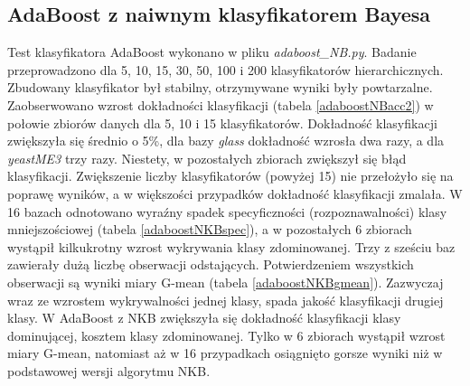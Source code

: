 \subsection{AdaBoost z naiwnym klasyfikatorem Bayesa}
Test klasyfikatora AdaBoost wykonano w pliku \textit{adaboost\_NB.py}. Badanie przeprowadzono dla 5, 10, 15, 30, 50, 100 i 200 klasyfikatorów hierarchicznych. Zbudowany klasyfikator był stabilny, otrzymywane wyniki były powtarzalne. Zaobserwowano wzrost dokładności klasyfikacji (tabela \ref{adaboostNBacc2}) w połowie zbiorów danych dla 5, 10 i 15 klasyfikatorów. Dokładność klasyfikacji zwiększyła się średnio o 5\%, dla bazy \textit{glass} dokładność wzrosła dwa razy, a dla \textit{yeastME3} trzy razy. Niestety, w pozostałych zbiorach zwiększył się błąd klasyfikacji. Zwiększenie liczby klasyfikatorów (powyżej 15) nie przełożyło się na poprawę wyników, a w większości przypadków dokładność klasyfikacji zmalała. W 16 bazach odnotowano wyraźny spadek specyficzności (rozpoznawalności) klasy mniejszościowej (tabela \ref{adaboostNKBspec}), a w pozostałych 6 zbiorach wystąpił kilkukrotny wzrost wykrywania klasy zdominowanej. Trzy z sześciu baz zawierały dużą liczbę obserwacji odstających. Potwierdzeniem wszystkich obserwacji są wyniki miary G-mean (tabela \ref{adaboostNKBgmean}). Zazwyczaj wraz ze wzrostem wykrywalności jednej klasy, spada jakość klasyfikacji drugiej klasy. W AdaBoost z NKB zwiększyła się dokładność klasyfikacji klasy dominującej, kosztem klasy zdominowanej. Tylko w 6 zbiorach wystąpił wzrost miary G-mean, natomiast aż w 16 przypadkach osiągnięto gorsze wyniki niż w podstawowej wersji algorytmu NKB.
